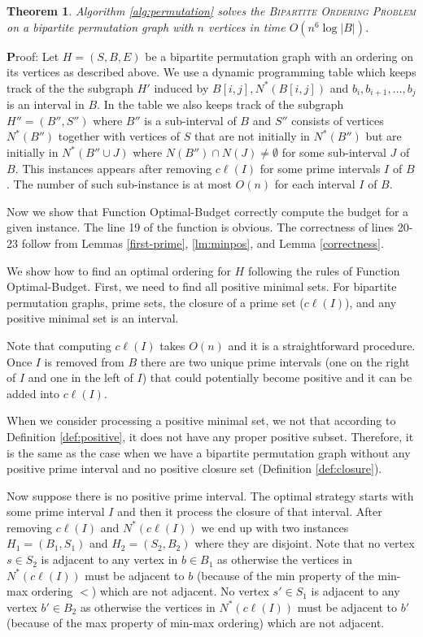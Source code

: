 \documentclass[letterpaper,11pt,abstracton]{scrartcl}
\newcommand{\pf}{{\textbf Proof: }}
\newtheorem{tm}[theorem]{Theorem}
\begin{document}
\begin{tm}\label{thm:poly-permutation}
Algorithm \ref{alg:permutation} solves the \textsc{Bipartite Ordering Problem} on a bipartite permutation graph with 
$n$ vertices in time $O(n^6 \log |B|)$. 
\end{tm}
\pf Let $H=(S,B,E)$ be a bipartite permutation graph with an ordering on its vertices
as described above. We use a dynamic programming table which keeps track of the the subgraph $H'$ induced by $B[i,j], N^*(B[i,j])$ and 
$b_i,b_{i+1},\dots,b_j$ is an interval in $B$. In the table we also keeps track of the subgraph $H''=(B'',S'')$ where $B''$ is a sub-interval of $B$
and $S''$ consists of vertices $N^*(B'')$ together with vertices of $S$ that are not initially in $N^*(B'')$ but are initially in 
$N^*(B'' \cup J)$ where $N(B'') \cap N(J)\neq \emptyset$ for some sub-interval $J$ of $B$. This instances appears after removing $c\ell(I)$ for some prime 
intervals $I$ of $B$. The number of such sub-instance is at most $O(n)$ for each interval $I$ of $B$. 

Now we show that Function Optimal-Budget correctly compute the budget for a given instance. 
The line 19 of the function is obvious. The correctness of lines 20-23 follow from Lemmas \ref{first-prime}, \ref{lm:minpos}, and 
Lemma \ref{correctness}.  



We show how to find an optimal ordering for $H$ following the rules of Function Optimal-Budget.
First, we need to find all positive minimal sets. For bipartite permutation graphs, prime sets, the closure of a prime set ($c\ell(I)$), 
and any positive minimal set is an interval.  

Note that computing $c\ell(I)$ takes $O(n)$ and it is a straightforward procedure. Once $I$ is removed from $B$ there are two 
unique prime intervals (one on the right of $I$ and one in the left of $I$) that could potentially become positive and it can be added into $c\ell(I)$.  


When we consider processing a positive minimal set,  we not that according to Definition \ref{def:positive},
it does not have any proper positive subset. Therefore, it is the same as the case when we have
a bipartite permutation graph without any positive prime interval and no positive closure set
(Definition \ref{def:closure}).

Now suppose there is no positive prime interval. The optimal strategy starts with some prime interval $I$ 
and then it process the closure of that interval. After removing $c\ell(I)$ and $N^*( c\ell(I))$
we end up with two instances $H_1=(B_1,S_1)$ and $H_2=(S_2,B_2)$ where they are disjoint.
Note that no vertex $s \in S_2$ is adjacent to any vertex in $b \in B_1$ as otherwise the vertices in $N^*(c\ell(I))$ must be adjacent to 
$b$ (because of the min property of the min-max ordering $<$) which are not adjacent. No vertex $s' \in S_1$ is adjacent to any vertex $b' \in B_2$ as otherwise
the vertices in $N^*(c\ell(I))$ must be adjacent to $b'$ (because of the max property of min-max ordering) which are not adjacent. 
\end{document}
